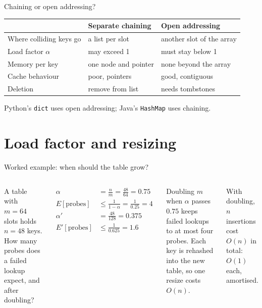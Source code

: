 \documentclass[aspectratio=169,11pt,t]{beamer}
\begin{document}
\begin{frame}{Chaining or open addressing?}
  \vspace{2mm}
  \centering
  \begin{tabular}{@{}l l l@{}}
    \toprule
    & \textbf{Separate chaining} & \textbf{Open addressing} \\
    \midrule
    Where colliding keys go & a list per slot & another slot of the array \\
    Load factor $\alpha$     & may exceed 1      & must stay below 1 \\
    Memory per key           & one node and pointer & none beyond the array \\
    Cache behaviour          & poor, pointers    & good, contiguous \\
    Deletion                 & remove from list  & needs tombstones \\
    \bottomrule
  \end{tabular}\par
  \vspace{4mm}
  \raggedright{\small\color{lcMuted}Python's \texttt{dict} uses open addressing; Java's
  \texttt{HashMap} uses chaining.\par}
\end{frame}

\section{Load factor and resizing}

\begin{frame}{Worked example: when should the table grow?}
  \begin{columns}[T,onlytextwidth]
      {\small A table with $m = 64$ slots holds $n = 48$ keys. How many probes does a
      failed lookup expect, and after doubling?\par}
      \vspace{1mm}
      {\small
      \begin{align*}
        \alpha &= \frac{n}{m} = \frac{48}{64} = 0.75 \\[0.3mm]
        E[\text{probes}] &\le \frac{1}{1-\alpha} = \frac{1}{0.25} = 4 \\[0.3mm]
        \alpha' &= \frac{48}{128} = 0.375 \\[0.3mm]
        E'[\text{probes}] &\le \frac{1}{0.625} = 1.6
      \end{align*}}
      \begin{examplebox}
        Doubling $m$ when $\alpha$ passes $0.75$ keeps failed lookups to at most four probes.
        Each key is rehashed into the new table, so one resize costs $O(n)$.
      \end{examplebox}
      \begin{theorembox}
        With doubling, $n$ insertions cost $O(n)$ in total: $O(1)$ each, amortised.
      \end{theorembox}
  \end{columns}
\end{frame}
\end{document}

